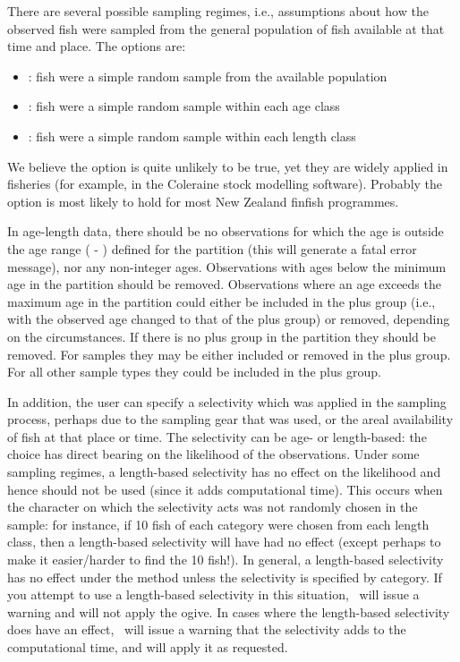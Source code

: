 There are several possible sampling regimes, i.e., assumptions about how the observed fish were sampled from the general population of fish available at that time and place. The options are: 
\begin{itemize}
	\item {}: fish were a simple random sample from the available population
	\item {}: fish were a simple random sample within each age class 
	\item {}: fish were a simple random sample within each length class
\end{itemize}
We believe the  option is quite unlikely to be true, yet they are widely applied in fisheries (for example, in the Coleraine \citep{hilborn2001coleraine} stock modelling software). Probably the  option is most likely to hold for most New Zealand finfish programmes.

In age-length data, there should be no observations for which the age is outside the age range ( - ) defined for the partition (this will generate a fatal error message), nor any non-integer ages. Observations with ages below the minimum age in the partition should be removed. Observations where an age exceeds the maximum age in the partition could either be included in the plus group (i.e., with the observed age changed to that of the plus group) or removed, depending on the circumstances. If there is no plus group in the partition they should be removed. For  samples they may be either included or removed in the plus group. For all other sample types they could be included in the plus group.

In addition, the user can specify a selectivity which was applied in the sampling process, perhaps due to the sampling gear that was used, or the areal availability of fish at that place or time. The selectivity can be age- or length-based: the choice has direct bearing on the likelihood of the observations. Under some sampling regimes, a length-based selectivity has no effect on the likelihood and hence should not be used (since it adds computational time). This occurs when the character on which the selectivity acts was not randomly chosen in the sample: for instance, if 10 fish of each category were chosen from each length class, then a length-based selectivity will have had no effect (except perhaps to make it easier/harder to find the 10 fish!). In general, a length-based selectivity has no effect under the  method unless the selectivity is specified by category. If you attempt to use a length-based selectivity in this situation, \CNAME\ will issue a warning and will not apply the ogive. In cases where the length-based selectivity does have an effect, \CNAME\ will issue a warning that the selectivity adds to the computational time, and will apply it as requested.

